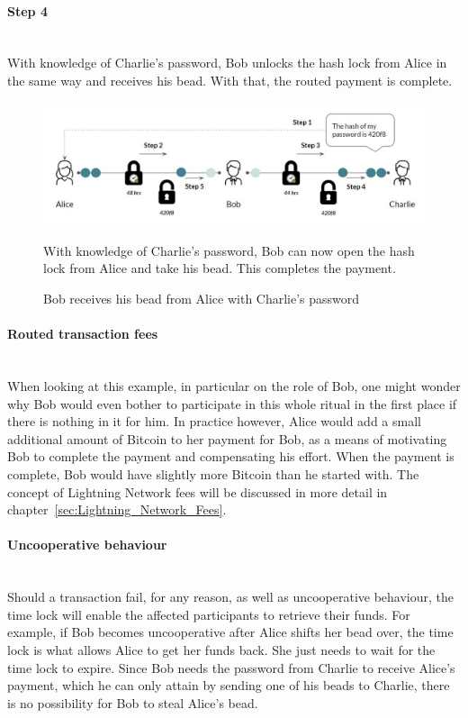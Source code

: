\documentclass[a4paper, 12pt]{report}
\begin{document}
\paragraph{Step 4} \hspace{0pt} \\
With knowledge of Charlie’s password, Bob unlocks the hash lock from Alice in the same way and receives his bead. With that, the routed payment is complete.

\begin{figure}[H]
	\includegraphics[width=\textwidth]{12_HTLC_Step4}
	\caption{Bob receives his bead from Alice with Charlie's password}
	\medskip
	\small With knowledge of Charlie's password, Bob can now open the hash lock from Alice and take his bead. This completes the payment.
	\label{fig:12_HTLC_Step4}
\end{figure} 

\paragraph{Routed transaction fees} \hspace{0pt} \\
When looking at this example, in particular on the role of Bob, one might wonder why Bob would even bother to participate in this whole ritual in the first place if there is nothing in it for him. In practice however, Alice would add a small additional amount of Bitcoin to her payment for Bob, as a means of motivating Bob to complete the payment and compensating his effort. When the payment is complete, Bob would have slightly more Bitcoin than he started with. The concept of Lightning Network fees will be discussed in more detail in chapter~\ref{sec:Lightning_Network_Fees}.

\paragraph{Uncooperative behaviour} \hspace{0pt} \\
Should a transaction fail, for any reason, as well as uncooperative behaviour, the time lock will enable the affected participants to retrieve their funds. For example, if Bob becomes uncooperative after Alice shifts her bead over, the time lock is what allows Alice to get her funds back. She just needs to wait for the time lock to expire. Since Bob needs the password from Charlie to receive Alice’s payment, which he can only attain by sending one of his beads to Charlie, there is no possibility for Bob to steal Alice’s bead.
\end{document}
